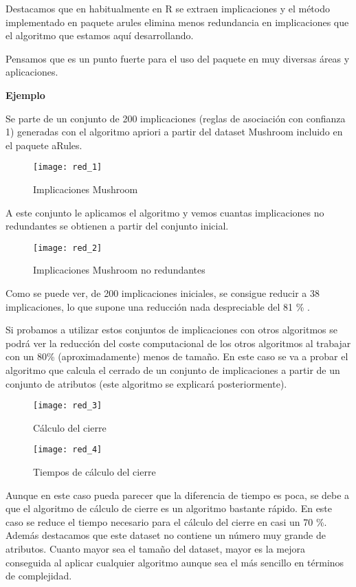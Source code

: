 Destacamos que en habitualmente en R se extraen implicaciones y el m\'etodo implementado en paquete arules elimina menos redundancia en implicaciones que el algoritmo que estamos aqu\'i desarrollando. 

Pensamos que es un punto fuerte para el uso del paquete en muy diversas \'areas y aplicaciones. 

\textbf{Ejemplo}

Se parte de un conjunto de 200 implicaciones (reglas de asociaci\'on con confianza 1) generadas con el algoritmo apriori a partir del dataset Mushroom incluido en el paquete aRules.

\begin{figure}[H]
    \centering
    \texttt{[image: red\_1]}
    \caption{Implicaciones Mushroom}
    \label{fig:red_1}
\end{figure} 
\newpage
A este conjunto le aplicamos el algoritmo y vemos cuantas implicaciones no redundantes se obtienen a partir del conjunto inicial.

\begin{figure}[H]
    \centering
    \texttt{[image: red\_2]}
    \caption{Implicaciones Mushroom no redundantes}
    \label{fig:red_2}
\end{figure} 

Como se puede ver, de 200 implicaciones iniciales, se consigue reducir a 38 implicaciones, lo que supone una reducci\'on nada despreciable del 81 \% .

Si probamos a utilizar estos conjuntos de implicaciones con otros algoritmos se podr\'a ver la reducci\'on del coste computacional de los otros algoritmos al trabajar con un 80\% (aproximadamente) menos de tama\~no. En este caso se va a probar el algoritmo que calcula el cerrado de un conjunto de implicaciones a partir de un conjunto de atributos (este algoritmo se explicar\'a posteriormente).

\begin{figure}[H]
    \centering
    \texttt{[image: red\_3]}
    \caption{C\'alculo del cierre}
    \label{fig:red_3}
\end{figure}

\begin{figure}[H]
    \centering
    \texttt{[image: red\_4]}
    \caption{Tiempos de c\'alculo del cierre}
    \label{fig:red_4}
\end{figure}

Aunque en este caso pueda parecer que la diferencia de tiempo es poca, se debe a que el algoritmo de c\'alculo de cierre es un algoritmo bastante r\'apido. En este caso se reduce el tiempo necesario para el c\'alculo del cierre en casi un 70 \%. Adem\'as destacamos que este dataset no contiene un n\'umero muy grande de atributos. Cuanto mayor sea el tama\~no del dataset, mayor es la mejora conseguida al aplicar cualquier algoritmo aunque sea el m\'as sencillo en t\'erminos de complejidad. 

